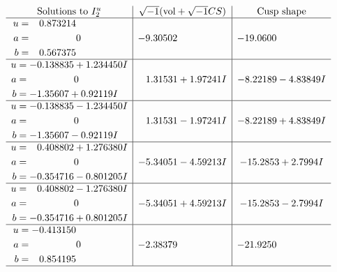 \documentclass[1p]{elsarticle_modified}
\theoremstyle{definition}
\newcommand{\I}{\sqrt{-1}}
\begin{document}
$$\begin{array}{c|c|c}  
\text{Solutions to }I^u_{2}& \I (\text{vol} + \sqrt{-1}CS) & \text{Cusp shape}\\
 \hline 
\begin{aligned}
u &= \phantom{-}0.873214\phantom{ +0.000000I} \\
a &= \phantom{-0.000000 } 0 \\
b &= \phantom{-}0.567375\phantom{ +0.000000I}\end{aligned}
 & -9.30502\phantom{ +0.000000I} & -19.0600\phantom{ +0.000000I} \\ \hline\begin{aligned}
u &= -0.138835 + 1.234450 I \\
a &= \phantom{-0.000000 } 0 \\
b &= -1.35607 + 0.92119 I\end{aligned}
 & \phantom{-}1.31531 + 1.97241 I & -8.22189 - 4.83849 I \\ \hline\begin{aligned}
u &= -0.138835 - 1.234450 I \\
a &= \phantom{-0.000000 } 0 \\
b &= -1.35607 - 0.92119 I\end{aligned}
 & \phantom{-}1.31531 - 1.97241 I & -8.22189 + 4.83849 I \\ \hline\begin{aligned}
u &= \phantom{-}0.408802 + 1.276380 I \\
a &= \phantom{-0.000000 } 0 \\
b &= -0.354716 - 0.801205 I\end{aligned}
 & -5.34051 - 4.59213 I & -15.2853 + 2.7994 I \\ \hline\begin{aligned}
u &= \phantom{-}0.408802 - 1.276380 I \\
a &= \phantom{-0.000000 } 0 \\
b &= -0.354716 + 0.801205 I\end{aligned}
 & -5.34051 + 4.59213 I & -15.2853 - 2.7994 I \\ \hline\begin{aligned}
u &= -0.413150\phantom{ +0.000000I} \\
a &= \phantom{-0.000000 } 0 \\
b &= \phantom{-}0.854195\phantom{ +0.000000I}\end{aligned}
 & -2.38379\phantom{ +0.000000I} & -21.9250\phantom{ +0.000000I}\\
 \hline 
 \end{array}$$\newpage
\end{document}
